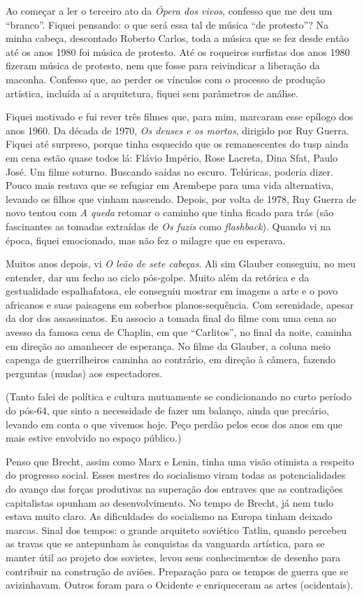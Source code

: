 {Ao começar a ler o terceiro ato da {\it Ópera dos vivos}, confesso que me
deu um “branco”. Fiquei pensando: o que será essa tal de música “de
protesto”? Na minha cabeça, descontado Roberto Carlos, toda a música que
se fez desde então até os anos 1980 foi música de protesto. Até os
roqueiros surfistas dos anos 1980 fizeram música de protesto, nem que fosse
para reivindicar a liberação da maconha. Confesso que, ao perder os
vínculos com o processo de produção artística, incluída aí a arquitetura,
fiquei sem parâmetros de análise.

Fiquei motivado e fui rever três filmes que, para mim, marcaram esse
epílogo dos anos 1960. Da década de 1970, {\it Os deuses e os mortos}, dirigido
por Ruy Guerra. Fiquei até surpreso, porque tinha esquecido que os
remanescentes do {\sc tusp} ainda em cena estão quase todos lá: Flávio
Império, Rose Lacreta, Dina Sfat, Paulo José. Um filme soturno. Buscando
saídas no escuro. Telúricas, poderia dizer. Pouco mais restava que se
refugiar em Arembepe para uma vida alternativa, levando os filhos que
vinham nascendo. Depois, por volta de 1978, Ruy Guerra de novo tentou com {\it A
queda} retomar o caminho que tinha ficado para trás (são fascinantes as
tomadas extraídas de {\it Os fuzis} como {\it flashback}). Quando vi na
época, fiquei emocionado, mas não fez o milagre que eu esperava.

Muitos anos depois, vi {\it O leão de sete cabeças}. Ali sim Glauber
conseguiu, no meu entender, dar um fecho ao ciclo pós-golpe. Muito além
da retórica e da gestualidade espalhafatosa, ele conseguiu mostrar em
imagens a arte e o povo africanos e suas paisagens em soberbos
planos-sequência. Com serenidade, apesar da dor dos assassinatos.
Eu associo a tomada final do filme com uma cena ao avesso da famosa cena
de Chaplin, em que “Carlitos”, no final da noite, caminha em direção ao
amanhecer de esperança. No filme da Glauber, a coluna meio capenga de
guerrilheiros caminha ao contrário, em direção à câmera, fazendo perguntas
(mudas) aos espectadores.

(Tanto falei de política e cultura mutuamente se condicionando no
curto período do pós-64, que sinto a necessidade de fazer um balanço,
ainda que precário, levando em conta o que vivemos hoje. Peço perdão
pelos ecos dos anos em que mais estive envolvido no espaço público.)

Penso que Brecht, assim como Marx e Lenin, tinha uma visão otimista a
respeito do progresso social. Esses mestres do socialismo viram todas as
potencialidades do avanço das forças produtivas na superação dos
entraves que as contradições capitalistas opunham ao desenvolvimento. No
tempo de Brecht, já nem tudo estava muito claro. As dificuldades do
socialismo na Europa tinham deixado marcas. Sinal dos tempos: o grande
arquiteto soviético Tatlin, quando percebeu as travas que se antepunham
às conquistas da vanguarda artística, para se manter útil ao projeto dos
sovietes, levou seus conhecimentos de desenho para contribuir na
construção de aviões. Preparação para os tempos de guerra que se
avizinhavam. Outros foram para o Ocidente e enriqueceram as artes (ocidentais).

}
